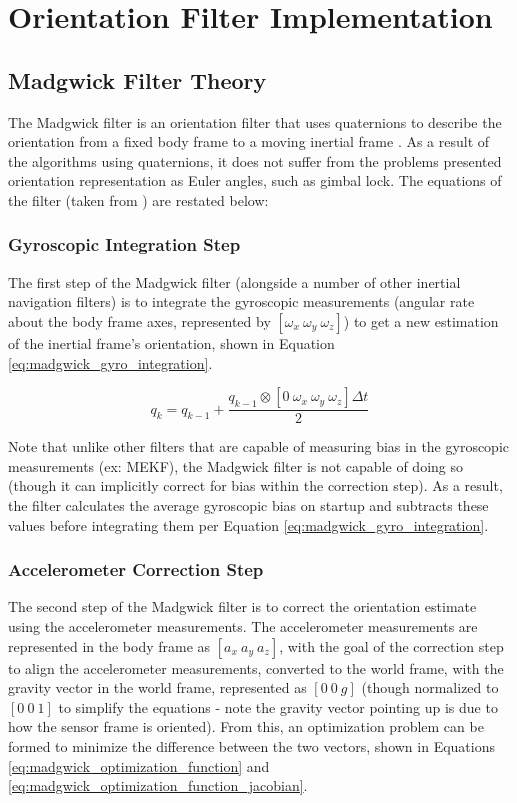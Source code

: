 \documentclass[bare_jrnl_transmag]{subfiles}
\begin{document}
\section{Orientation Filter Implementation}
\subsection{Madgwick Filter Theory}
The Madgwick filter is an orientation filter that uses quaternions to describe the orientation from a fixed body frame to a moving inertial frame \cite{ahrs_madgwick}. As a result of the algorithms using quaternions, it does not suffer from the problems presented orientation representation as Euler angles, such as gimbal lock. The equations of the filter (taken from \cite{ahrs_madgwick}) are restated below:

\subsubsection{Gyroscopic Integration Step}
The first step of the Madgwick filter (alongside a number of other inertial navigation filters) is to integrate the gyroscopic measurements (angular rate about the body frame axes, represented by $[\omega_x \ \omega_y \ \omega_z]$) to get a new estimation of the inertial frame's orientation, shown in Equation \ref{eq:madgwick_gyro_integration}.

\begin{equation}
    q_{k} = q_{k-1} + \frac{q_{k-1} \otimes [0 \ \omega_x \ \omega_y \ \omega_z] \Delta t}{2}
    \label{eq:madgwick_gyro_integration}
\end{equation}

Note that unlike other filters that are capable of measuring bias in the gyroscopic measurements (ex: MEKF), the Madgwick filter is not capable of doing so (though it can implicitly correct for bias within the correction step). As a result, the filter calculates the average gyroscopic bias on startup and subtracts these values before integrating them per Equation \ref{eq:madgwick_gyro_integration}.

\subsubsection{Accelerometer Correction Step}
The second step of the Madgwick filter is to correct the orientation estimate using the accelerometer measurements. The accelerometer measurements are represented in the body frame as $[a_x \ a_y \ a_z]$, with the goal of the correction step to align the accelerometer measurements, converted to the world frame, with the gravity vector in the world frame, represented as $[0 \ 0 \ g]$ (though normalized to $[0 \ 0 \ 1]$ to simplify the equations - note the gravity vector pointing up is due to how the sensor frame is oriented). From this, an optimization problem can be formed to minimize the difference between the two vectors, shown in Equations \ref{eq:madgwick_optimization_function} and \ref{eq:madgwick_optimization_function_jacobian}.
\end{document}

